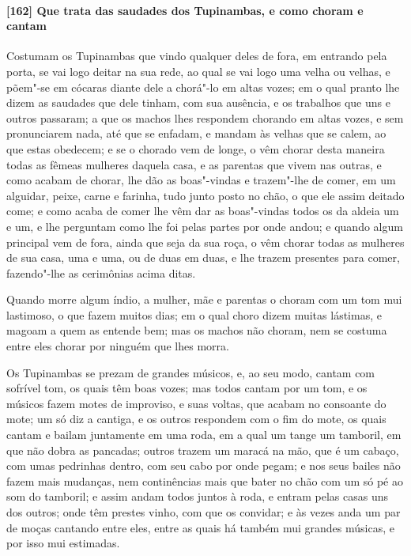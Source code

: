 \begin{linenumbers}
\paragraph{[162] Que trata das saudades dos Tupinambas, e como choram e cantam}\quad
Costumam os Tupinambas que vindo qualquer deles de fora, em entrando pela porta, se vai
logo deitar na sua rede, ao qual se vai logo uma velha ou velhas, e põem"-se em cócaras
diante dele a chorá"-lo em altas vozes; em o qual pranto lhe dizem as saudades que dele
tinham, com sua ausência, e os trabalhos que uns e outros passaram; a que os machos lhes
respondem chorando em altas vozes, e sem pronunciarem nada, até que se enfadam, e mandam
às velhas que se calem, ao que estas obedecem; e se o chorado vem de longe, o vêm chorar
desta maneira todas as fêmeas mulheres daquela casa, e as parentas que vivem nas outras, e
como acabam de chorar, lhe dão as boas"-vindas e trazem"-lhe de comer, em um alguidar,
peixe, carne e farinha, tudo junto posto no chão, o que ele assim deitado come; e como
acaba de comer lhe vêm dar as boas"-vindas todos os da aldeia um e um, e lhe perguntam como
lhe foi pelas partes por onde andou; e quando algum principal vem de fora, ainda que seja
da sua roça, o vêm chorar todas as mulheres de sua casa, uma e uma, ou de duas em duas, e
lhe trazem presentes para comer, fazendo"-lhe as cerimônias acima ditas.

Quando morre algum índio, a mulher, mãe e parentas o choram com um tom mui lastimoso, o
que fazem muitos dias; em o qual choro dizem muitas lástimas, e magoam a quem as entende
bem; mas os machos não choram, nem se costuma entre eles chorar por ninguém que lhes
morra.

Os Tupinambas se prezam de grandes músicos, e, ao seu modo, cantam com sofrível tom, os
quais têm boas vozes; mas todos cantam por um tom, e os músicos fazem motes de improviso,
e suas voltas, que acabam no consoante do mote; um só diz a cantiga, e os outros respondem
com o fim do mote, os quais cantam e bailam juntamente em uma roda, em a qual um tange um
tamboril, em que não dobra as pancadas; outros trazem um maracá na mão, que é um cabaço,
com umas pedrinhas dentro, com seu cabo por onde pegam; e nos seus bailes não fazem mais
mudanças, nem continências mais que bater no chão com um só pé ao som do tamboril; e assim
andam todos juntos à roda, e entram pelas casas uns dos outros; onde têm prestes vinho,
com que os convidar; e às vezes anda um par de moças cantando entre eles, entre as quais
há também mui grandes músicas, e por isso mui estimadas.


\end{linenumbers}
